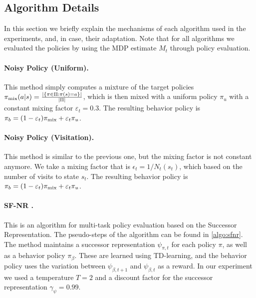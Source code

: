 \subsection{Algorithm Details}\label{app:algorithms}
In this section we briefly explain the mechanisms of each algorithm used in the experiments, and, in case, their adaptation. Note that for all algorithms we evaluated the policies by  using the MDP estimate $M_t$ through policy evaluation.


\paragraph{ Noisy Policy (Uniform).} This method simply computes a mixture of the target policies $\pi_{\rm mix}(a|s) = \frac{|\{\pi\in \Pi: \pi(s)=a\}|}{|\Pi|}$, which is then mixed with a uniform policy $\pi_u$ with a constant mixing factor $\varepsilon_t=0.3$. The resulting behavior policy is $\pi_b =(1-\varepsilon_t)\pi_{\rm mix} +\varepsilon_t \pi_u$.

\paragraph{Noisy Policy (Visitation).} This method is similar to the previous one, but the mixing factor is not constant anymore. We take a mixing factor that is $\epsilon_t=1/N_t(s_t)$, which based on the number of visits to state $s_t$. The resulting behavior policy is $\pi_b =(1-\varepsilon_t)\pi_{\rm mix} +\varepsilon_t \pi_u$.

\paragraph{SF-NR \cite{mcleod2021continual}.} This is an algorithm for multi-task policy evaluation based on the Successor Representation. The pseudo-steps of the algorithm can be found in \cref{algo:sfnr}. The method maintains a successor representation $\psi_{\pi,t}$ for each policy $\pi$, as well as a behavior policy $\pi_\beta$. These are learned using TD-learning, and the behavior policy uses the variation between $\psi_{\beta,t+1}$ and $\psi_{\beta,t}$ as a reward. 
In our experiment we used a temperature $T=2$ and a discount factor for the successor representation $\gamma_\psi=0.99$.

